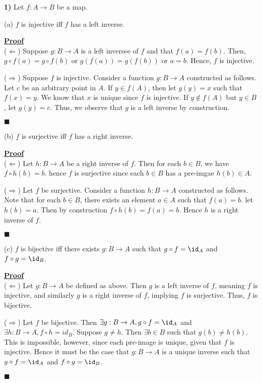 \documentclass[12pt,a4paper]{article}
\newcommand{\prob}[2]{\textbf{#1)} #2}
\newenvironment{proof}
{
\textbf{\underline{Proof}} \\
}
{
\begin{flushright}
$\blacksquare$
\end{flushright}}
\begin{document}
\prob{1}{Let $f: A \rightarrow B$ be a map.} 

(a) $f$ is injective iff $f$ has a left inverse.

\begin{proof}
($\Leftarrow$) Suppose $g: B \rightarrow A$ is a left inversee of $f$ and that $f(a) = f(b)$. Then, $g \circ f(a) = g \circ f(b)$ or $g(f(a)) = g(f(b))$ or $a = b$. Hence, $f$ is injective.

($\Rightarrow$) Suppose $f$ is injective. Consider a function $g: B \rightarrow A$ constructed as follows. Let $c$ be an arbitrary point in $A$. If $y \in f(A)$, then let $g(y) = x$ such that $f(x) = y$. We know that $x$ is unique since $f$ is injective. If $y \not\in f(A)$ but $y \in B$, let $g(y) = c$. Thus, we observe that $g$ is a left inverse by construction.
\end{proof}

(b) $f$ is surjective iff $f$ has a right inverse.

\begin{proof}
($\Leftarrow$) Let $h: B \rightarrow A$ be a right inverse of $f$. Then for each $b \in B$, we have $f \circ h(b) = b$. hence $f$ is surjective since each $b \in B$ has a pre-imgae $h(b) \in A$.

($\Rightarrow$) Let $f$ be surjective. Consider a function $h: B \rightarrow A$ constructed as follows. Note that for each $b \in B$, there exists an element $a \in A$ such that $f(a) = b$. let $h(b) = a$. Then by construction $f \circ h(b) = f(a) = b$. Hence $h$ is a right inverse of $f$. 
\end{proof}

(c) $f$ is bijective iff there exists $g: B \rightarrow A$ such that $g \circ f = \id_{A}$ and $f \circ g = \id_{B}$.

\begin{proof}
($\Leftarrow$) Let $g: B \rightarrow A$ be defined as above. Then $g$ is a left inverse of $f$, meaning $f$ is injective, and similarly $g$ is a right inverse of $f$, implying $f$ is surjective. Thus, $f$ is bijective.

($\Rightarrow$) Let $f$ be bijective. Then $\exists g: B \rightarrow A, g \circ f = \id_{A}$ and $\exists h: B \rightarrow A, f \circ h = id_{B}$. Suppose $g \not= h$. Then $\exists b \in B$ such that $g(b) \not= h(b)$. This is impossible, however, since  each pre-image is unique, given that $f$ is injective. Hence it must be the case that $g: B \rightarrow A$ is a unique inverse such that $g \circ f = \id_{A}$ and $f \circ g = \id_{B}$.
\end{proof}
\end{document}
